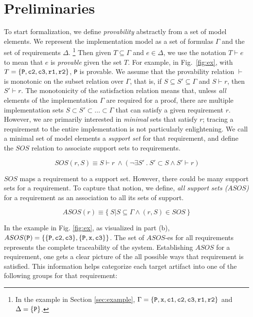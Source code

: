 
\section{Preliminaries}
\label{sec:background}
\newcommand{\satisfies}{\vdash_{\!\!s}}
\newcommand{\nsatisfies}{\nvdash_{\!\!s}}

To start formalization, we define \emph{provability} abstractly from a set of model elements.  We represent the implementation model as a set of formulas $\Gamma$  and the set of requirements $\Delta$.
\footnote{In the example in Section \ref{sec:example}, $\Gamma = \{{\tt P}, {\tt x}, {\tt c1}, {\tt c2}, {\tt c3}, {\tt r1}, {\tt r2}\}$ and $\Delta = \{{\tt P}\}$.}
Then given $T \subseteq \Gamma$ and $e \in \Delta$, we use the notation $T \vdash e$ to mean that $e$ is \emph{provable} given the set $T$. For example, in Fig.~\ref{fig:ex}, with $T = \{{\tt P}, {\tt c2}, {\tt c3}, {\tt r1}, {\tt r2}\}$, {\tt P} is provable. We assume that the provability relation $\vdash$ is monotonic on the subset relation over $\Gamma$, that is, if $S \subseteq S' \subseteq \Gamma$ and $S \vdash r$, then $S' \vdash r$.  The monotonicity of the satisfaction relation means that, unless {\em all} elements of the implementation $\Gamma$ are required for a proof, there are multiple implementation sets $S \subset S' \subset \ldots \subset \Gamma$ that can satisfy a given requirement $r$.  However, we are primarily interested in {\em minimal} sets that satisfy $r$; tracing a requirement to the entire implementation is not particularly enlightening.  We call a minimal set of model elements a \emph{support set} for that requirement, and define the $SOS$ relation to associate support sets to requirements.

$$ \ SOS(r, S) \equiv S \vdash r~ \land   (\neg\exists S'\ .\ S' \subset S \wedge S' \vdash r) $$

$SOS$ maps a requirement to a support set. However, there could be many support sets for a requirement. To capture that notion, we define, \emph{all support sets ($ASOS$)} for a requirement as an association to all its sets of support.


$$ ASOS(r) \equiv  \{\ S | S \subseteq \Gamma \land (r,S) \in SOS\ \} $$

In the example in Fig. \ref{fig:ex}, as visualized in part (b),
$ASOS ({\tt P}) = \{\{{\tt P}, {\tt c2}, {\tt c3}\}, \{{\tt P}, {\tt x}, {\tt c3}\}\}$. The set of $ASOS$-es for all requirements represents the complete traceability of the system. Establishing $ASOS$ for a requirement, one gets a clear picture of the all possible ways that requirement is satisfied. This information helps categorize each target artifact into one of the following groups for that requirement:

